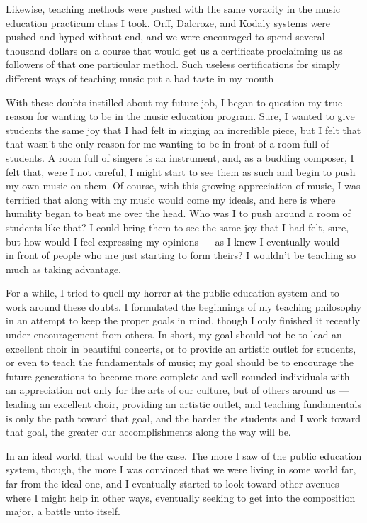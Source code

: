 Likewise, teaching methods were pushed with the same voracity in the music education practicum class I took. Orff, Dalcroze, and Kodaly systems were pushed and hyped without end, and we were encouraged to spend several thousand dollars on a course that would get us a certificate proclaiming us as followers of that one particular method. Such useless certifications for simply different ways of teaching music put a bad taste in my mouth

With these doubts instilled about my future job, I began to question my true reason for wanting to be in the music education program. Sure, I wanted to give students the same joy that I had felt in singing an incredible piece, but I felt that that wasn't the only reason for me wanting to be in front of a room full of students. A room full of singers is an instrument, and, as a budding composer, I felt that, were I not careful, I might start to see them as such and begin to push my own music on them. Of course, with this growing appreciation of music, I was terrified that along with my music would come my ideals, and here is where humility began to beat me over the head. Who was I to push around a room of students like that? I could bring them to see the same joy that I had felt, sure, but how would I feel expressing my opinions --- as I knew I eventually would --- in front of people who are just starting to form theirs? I wouldn't be teaching so much as taking advantage.

For a while, I tried to quell my horror at the public education system and to work around these doubts. I formulated the beginnings of my teaching philosophy in an attempt to keep the proper goals in mind, though I only finished it recently under encouragement from others. In short, my goal should not be to lead an excellent choir in beautiful concerts, or to provide an artistic outlet for students, or even to teach the fundamentals of music; my goal should be to encourage the future generations to become more complete and well rounded individuals with an appreciation not only for the arts of our culture, but of others around us --- leading an excellent choir, providing an artistic outlet, and teaching fundamentals is only the path toward that goal, and the harder the students and I work toward that goal, the greater our accomplishments along the way will be.

In an ideal world, that would be the case. The more I saw of the public education system, though, the more I was convinced that we were living in some world far, far from the ideal one, and I eventually started to look toward other avenues where I might help in other ways, eventually seeking to get into the composition major, a battle unto itself.
